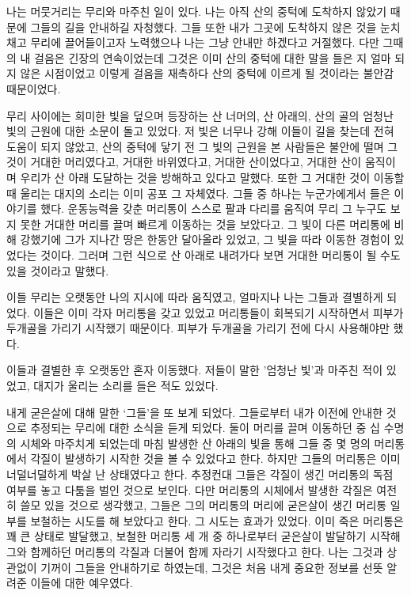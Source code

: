 \documentclass[12pt, b6paper, openany]{memoir}
\newenvironment{article}{}{}
\begin{document}
\begin{article}
나는 머뭇거리는 무리와 마주친 일이 있다. 나는 아직 산의 중턱에 도착하지 않았기 때문에 그들의 길을 안내하길 자청했다. 그들 또한 내가 그곳에 도착하지 않은 것을 눈치채고 무리에 끌어들이고자 노력했으나 나는 그냥 안내만 하겠다고 거절했다. 다만 그때의 내 걸음은 긴장의 연속이었는데 그것은 이미 산의 중턱에 대한 말을 들은 지 얼마 되지 않은 시점이었고 이렇게 걸음을 재촉하다 산의 중턱에 이르게 될 것이라는 불안감 때문이었다.

무리 사이에는 희미한 빛을 덮으며 등장하는 산 너머의, 산 아래의, 산의 골의 엄청난 빛의 근원에 대한 소문이 돌고 있었다. 저 빛은 너무나 강해 이들이 길을 찾는데 전혀 도움이 되지 않았고, 산의 중턱에 닿기 전 그 빛의 근원을 본 사람들은 불안에 떨며 그것이 거대한 머리였다고, 거대한 바위였다고, 거대한 산이었다고, 거대한 산이 움직이며 우리가 산 아래 도달하는 것을 방해하고 있다고 말했다. 또한 그 거대한 것이 이동할 때 울리는 대지의 소리는 이미 공포 그 자체였다. 그들 중 하나는 누군가에게서 들은 이야기를 했다. 운동능력을 갖춘 머리통이 스스로 팔과 다리를 움직여 무리 그 누구도 보지 못한 거대한 머리를 끌며 빠르게 이동하는 것을 보았다고. 그 빛이 다른 머리통에 비해 강했기에 그가 지나간 땅은 한동안 달아올라 있었고, 그 빛을 따라 이동한 경험이 있었다는 것이다. 그러며 그런 식으로 산 아래로 내려가다 보면 거대한 머리통이 될 수도 있을 것이라고 말했다.

이들 무리는 오랫동안 나의 지시에 따라 움직였고, 얼마지나 나는 그들과 결별하게 되었다. 이들은 이미 각자 머리통을 갖고 있었고 머리통들이 회복되기 시작하면서 피부가 두개골을 가리기 시작했기 때문이다. 피부가 두개골을 가리기 전에 다시 사용해야만 했다.

이들과 결별한 후 오랫동안 혼자 이동했다. 저들이 말한 '엄청난 빛'과 마주친 적이 있었고, 대지가 울리는 소리를 들은 적도 있었다.

내게 굳은살에 대해 말한 `그들'을 또 보게 되었다. 그들로부터 내가 이전에 안내한 것으로 추정되는 무리에 대한 소식을 듣게 되었다. 둘이 머리를 끌며 이동하던 중 십 수명의 시체와 마주치게 되었는데 마침 발생한 산 아래의 빛을 통해 그들 중 몇 명의 머리통에서 각질이 발생하기 시작한 것을 볼 수 있었다고 한다. 하지만 그들의 머리통은 이미 너덜너덜하게 박살 난 상태였다고 한다. 추정컨대 그들은 각질이 생긴 머리통의 독점 여부를 놓고 다툼을 벌인 것으로 보인다. 다만 머리통의 시체에서 발생한 각질은 여전히 쓸모 있을 것으로 생각했고, 그들은 그의 머리통의 머리에 굳은살이 생긴 머리통 일부를 보철하는 시도를 해 보았다고 한다. 그 시도는 효과가 있었다. 이미 죽은 머리통은 꽤 큰 상태로 발달했고, 보철한 머리통 세 개 중 하나로부터 굳은살이 발달하기 시작해 그와 함께하던 머리통의 각질과 더불어 함께 자라기 시작했다고 한다. 나는 그것과 상관없이 기꺼이 그들을 안내하기로 하였는데, 그것은 처음 내게 중요한 정보를 선뜻 알려준 이들에 대한 예우였다.


\end{article}
\end{document}
